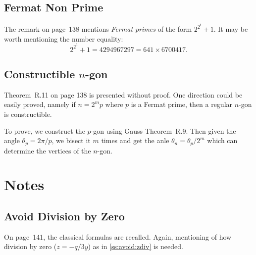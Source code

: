 \subsection{Fermat Non Prime}

The remark on page~138 mentions \emph{Fermat primes} of the form
\(2^{2^t}+1\). It may be worth mentioning the number equality:
\begin{equation*}
 2^{2^5} + 1 = 4294967297 = 641 \times 6700417.
\end{equation*}


\subsection{Constructible \ensuremath{n}-gon}

Theorem~R.11 on page 138 is presented without proof.
One direction could be easily proved, namely if
\(n=2^m p\) where $p$ is a Fermat prime, then a regular
$n$-gon is constructible.

To prove, we construct the $p$-gon using Gauss Theorem~R.9.
Then given the angle \(\theta_p = 2\pi/p\), we bisect it $m$ times
and get the anle \(\theta_n = \theta_p / 2^m\)
which can determine the vertices of the $n$-gon.



\section{Notes}

\subsection{Avoid Division by Zero} \label{ofgt:avoid:zdiv}

On page~141, the classical formulas are recalled.
Again, mentioning of how division by zero (\(z=-q/3y\))
as in \ref{ss:avoid:zdiv} is needed.

